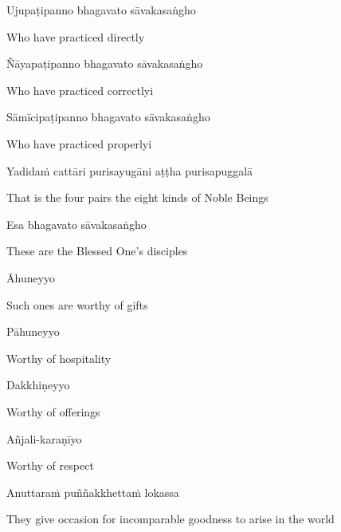 Ujupaṭipanno bhagavato sāvakasaṅgho

\begin{cprenglish}
  Who have practiced directly
\end{cprenglish}

Ñāyapaṭipanno bhagavato sāvakasaṅgho

\begin{cprenglish}
  Who have practiced correctlyi
\end{cprenglish}

Sāmīcipaṭipanno bhagavato sāvakasaṅgho

\begin{cprenglish}
  Who have practiced properlyi
\end{cprenglish}

Yadidaṁ cattāri purisayugāni aṭṭha purisapuggalā

\begin{cprenglish}
  That is the four pairs the eight kinds of Noble Beings
\end{cprenglish}

Esa bhagavato sāvakasaṅgho

\begin{cprenglish}
  These are the Blessed One’s disciples
\end{cprenglish}

Āhuneyyo

\begin{cprenglish}
  Such ones are worthy of gifts
\end{cprenglish}

Pāhuneyyo

\begin{cprenglish}
  Worthy of hospitality
\end{cprenglish}

Dakkhiṇeyyo

\begin{cprenglish}
  Worthy of offerings
\end{cprenglish}

Añjali-karaṇīyo

\begin{cprenglish}
  Worthy of respect
\end{cprenglish}

Anuttaraṁ puññakkhettaṁ lokassa

\begin{cprenglish}
  They give occasion for incomparable goodness to arise in the world
\end{cprenglish}

